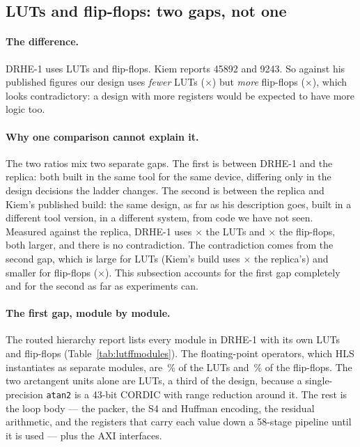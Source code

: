 \subsection{LUTs and flip-flops: two gaps, not one}
\label{sec:acc_lutff}

\paragraph{The difference.} DRHE-1 uses  LUTs and
 flip-flops. Kiem reports \num{45892} and \num{9243}. So
against his published figures our design uses \emph{fewer} LUTs
($\times$) but \emph{more} flip-flops
($\times$), which looks contradictory: a design with more
registers would be expected to have more logic too.

\paragraph{Why one comparison cannot explain it.} The two ratios mix two
separate gaps. The first is between DRHE-1 and the replica: both built in the
same tool for the same device, differing only in the design decisions the
ladder changes. The second is between the replica and Kiem's published build:
the same design, as far as his description goes, built in a different tool
version, in a different system, from code we have not seen. Measured against
the replica, DRHE-1 uses $\times$ the LUTs and
$\times$ the flip-flops, both larger, and there is no
contradiction. The contradiction comes from the second gap, which is large for
LUTs (Kiem's build uses $\times$ the replica's) and
smaller for flip-flops ($\times$). This subsection accounts
for the first gap completely and for the second as far as experiments can.

\paragraph{The first gap, module by module.} The routed hierarchy report lists
every module in DRHE-1 with its own LUTs and flip-flops
(Table~\ref{tab:lutffmodules}). The floating-point operators, which HLS
instantiates as separate modules, are \,\% of the LUTs
and \,\% of the flip-flops. The two arctangent units
alone are  LUTs, a third of the design, because a
single-precision \texttt{atan2} is a 43-bit CORDIC with range reduction around
it. The rest is the loop body --- the packer, the S4 and Huffman encoding, the
residual arithmetic, and the registers that carry each value down a 58-stage
pipeline until it is used --- plus the AXI interfaces.

